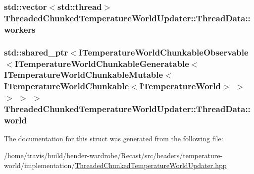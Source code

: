 \hypertarget{struct_threaded_chunked_temperature_world_updater_1_1_thread_data_a9007df155da319c2c0d22950a32151e1}{
\subsubsection[{workers}]{\setlength{\rightskip}{0pt plus 5cm}std\-::vector$<$std\-::thread$>$ Threaded\-Chunked\-Temperature\-World\-Updater\-::\-Thread\-Data\-::workers}}\label{struct_threaded_chunked_temperature_world_updater_1_1_thread_data_a9007df155da319c2c0d22950a32151e1}
\hypertarget{struct_threaded_chunked_temperature_world_updater_1_1_thread_data_acc751ecf3ebda6bb89a20917380453de}{
\subsubsection[{world}]{\setlength{\rightskip}{0pt plus 5cm}std\-::shared\-\_\-ptr$<${\bf I\-Temperature\-World\-Chunkable\-Observable}$<${\bf I\-Temperature\-World\-Chunkable\-Generatable}$<${\bf I\-Temperature\-World\-Chunkable\-Mutable}$<${\bf I\-Temperature\-World\-Chunkable}$<${\bf I\-Temperature\-World}$>$ $>$ $>$ $>$ $>$ Threaded\-Chunked\-Temperature\-World\-Updater\-::\-Thread\-Data\-::world}}\label{struct_threaded_chunked_temperature_world_updater_1_1_thread_data_acc751ecf3ebda6bb89a20917380453de}


The documentation for this struct was generated from the following file\-:\begin{DoxyCompactItemize}
\item 
/home/travis/build/bender-\/wardrobe/\-Recast/src/headers/temperature-\/world/implementation/\hyperlink{_threaded_chunked_temperature_world_updater_8hpp}{Threaded\-Chunked\-Temperature\-World\-Updater.\-hpp}\end{DoxyCompactItemize}
